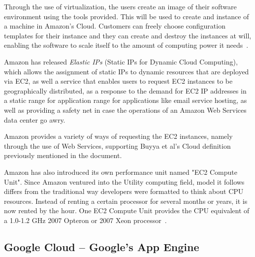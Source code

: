 Through the use of virtualization, the users create an image of their software environment using the tools provided. This will be used to create and instance of a machine in Amazon's Cloud. Customers can freely choose configuration templates for their instance and they can create and destroy the instances at will, enabling the software to scale itself to the amount of computing power it needs~\cite{grids-and-clouds, hazel}.

Amazon has released \textit{Elastic IPs} (Static IPs for Dynamic Cloud Computing), which allows the assignment of static IPs to dynamic resources that are deployed via EC2, as well a service that enables users to request EC2 instances to be geographically distributed, as a response to the demand for EC2 IP addresses in a static range for application range for applications like email service hosting, as well as providing a safety net in case the operations of an Amazon Web Services data center go awry. 

Amazon provides a variety of ways of requesting the EC2 instances, namely through the use of Web Services, supporting Buyya et al's Cloud definition previously mentioned in the document.

Amazon has also introduced its own performance unit named "EC2 Compute Unit". Since Amazon ventured into the Utility computing field, model it follows differs from the traditional way developers were formatted to think about CPU resources. Instead of renting a certain processor for several months or years, it is now rented by the hour. One EC2 Compute Unit provides the CPU equivalent of a 1.0-1.2 GHz 2007 Opteron or 2007 Xeon processor~\cite{amazon-aws}.

\subsection{Google Cloud -- Google's App Engine}\label{googleapps}

